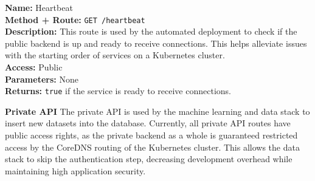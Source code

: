 \begin{itemize}
{\begin{itemize}
{        \textbf{Name:} Heartbeat\\
        \textbf{Method + Route:} \texttt{GET /heartbeat}\\
        \textbf{Description:} This route is used by the automated deployment to
        check if the public backend is up and ready to receive connections. This
        helps alleviate issues with the starting order of services on a
        Kubernetes cluster.\\
        \textbf{Access:} Public\\
        \textbf{Parameters:} None\\
        \textbf{Returns:} \texttt{true} if the service is ready to receive
        connections.\\
    }
    \end{itemize}
  }

\end{itemize}

\textbf{Private API}
The private API is used by the machine learning and data stack to insert new
datasets into the database. Currently, all private API routes have public access
rights, as the private backend as a whole is guaranteed restricted access by the
CoreDNS routing of the Kubernetes cluster. This allows the data stack to skip
the authentication step, decreasing development overhead while maintaining high
application security.

